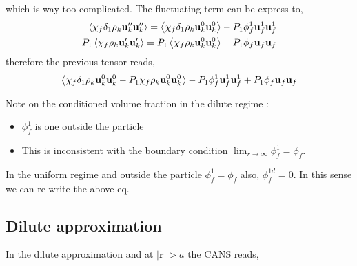 \documentclass[11pt]{My_preprint}
\begin{document}
which is way too complicated. 
The fluctuating term can be express to, 
\begin{align}
    \left<\chi_f \delta_1 \rho_k \textbf{u}''_k\textbf{u}''_k\right>
    = 
    \left<\chi_f \delta_1 \rho_k \textbf{u}_k^0 \textbf{u}_k^0 \right>
    - P_1 \phi_f^1 \textbf{u}_f^1\textbf{u}_f^1 \\
    P_1 \left<\chi_f \rho_k \textbf{u}_k'\textbf{u}_k'\right>
    = 
    P_1 \left<\chi_f \rho_k \textbf{u}_k^0 \textbf{u}_k^0 \right>
    - P_1 \phi_f \textbf{u}_f\textbf{u}_f 
\end{align}
therefore the previous tensor reads, 
\begin{equation}
    \left<\chi_f \delta_1 \rho_k \textbf{u}_k^0 \textbf{u}_k^0 
    - P_1 \chi_f \rho_k \textbf{u}_k^0 \textbf{u}_k^0\right>
    - P_1 \phi_f^1 \textbf{u}_f^1\textbf{u}_f^1
    + P_1 \phi_f \textbf{u}_f\textbf{u}_f 
\end{equation}

Note on the conditioned volume fraction in the dilute regime :
\begin{itemize}
    \item $\phi_f^1$ is one outside the particle 
    \item This is inconsistent with the boundary condition $\lim_{r\to\infty} \phi_f^1 = \phi_f$. 
\end{itemize}
In the uniform regime and outside the particle $\phi_f^1 = \phi_f$ also, $\phi_f^{1d} =  0$. 
In this sense we can re-write the above eq. 

\subsection{Dilute approximation}

In the dilute approximation and at $|\textbf{r}| > a$ the CANS reads,
\end{document}
